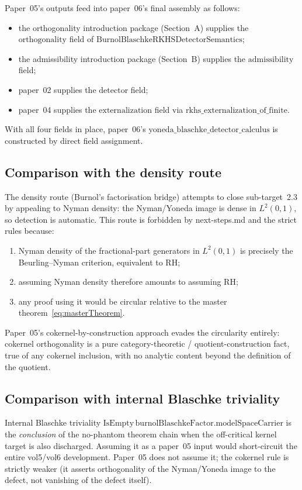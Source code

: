 \documentclass[12pt]{article}
\theoremstyle{definition}
\theoremstyle{remark}
\begin{document}
Paper~05's outputs feed into paper~06's final assembly as follows:
\begin{itemize}
  \item the orthogonality introduction package (Section~A) supplies the $\mathrm{orthogonality}$ field of $\mathrm{BurnolBlaschkeRKHSDetectorSemantics}$;
  \item the admissibility introduction package (Section~B) supplies the $\mathrm{admissibility}$ field;
  \item paper~02 supplies the $\mathrm{detector}$ field;
  \item paper~04 supplies the $\mathrm{externalization}$ field via $\mathrm{rkhs\_externalization\_of\_finite}$.
\end{itemize}
With all four fields in place, paper~06's $\mathrm{yoneda\_blaschke\_detector\_calculus}$ is constructed by direct field assignment.

\subsection{Comparison with the density route}

The density route (Burnol's factorisation bridge) attempts to close sub-target~2.3 by appealing to Nyman density: the Nyman/Yoneda image is dense in $L^{2}(0,1)$, so detection is automatic. This route is forbidden by next-steps.md and the strict rules because:
\begin{enumerate}
  \item Nyman density of the fractional-part generators in $L^{2}(0,1)$ is precisely the Beurling--Nyman criterion, equivalent to RH;
  \item assuming Nyman density therefore amounts to assuming RH;
  \item any proof using it would be circular relative to the master theorem~\eqref{eq:masterTheorem}.
\end{enumerate}
Paper~05's cokernel-by-construction approach evades the circularity entirely: cokernel orthogonality is a pure category-theoretic / quotient-construction fact, true of any cokernel inclusion, with no analytic content beyond the definition of the quotient.

\subsection{Comparison with internal Blaschke triviality}

Internal Blaschke triviality $\mathrm{IsEmpty}\,\mathrm{burnolBlaschkeFactor.modelSpaceCarrier}$ is the \emph{conclusion} of the no-phantom theorem chain when the off-critical kernel target is also discharged. Assuming it as a paper~05 input would short-circuit the entire vol5/vol6 development. Paper~05 does not assume it; the cokernel rule is strictly weaker (it asserts orthogonality of the Nyman/Yoneda image to the defect, not vanishing of the defect itself).
\end{document}

